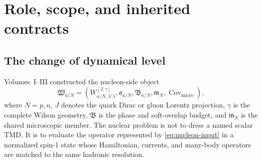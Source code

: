 \documentclass[11pt]{article}
\newcommand{\micro}{\mathrm{micro}}
\begin{document}
\begin{abstract}
Coherent small-\(x\) shadowing is formulated as a helicity-resolved
multiple-scattering amplitude using the same deuteron state and diffractive
nucleon amplitudes; polarized and tensor shadowing cannot be copied from an
unpolarized ratio.  The \(NN\pi\) sector carries a genuine spin-resolved
three-body amplitude and includes pion-active, nucleon-active, and transition
operators with a subtraction that prevents double counting the nucleon's
internal pion cloud.  \(\Delta\Delta\), six-quark, hidden-color, and
short-range sectors require explicit amplitudes and operators before they may
enter a nonzero central prediction.  Completely positive maps are derived
only after a justified partial trace; coherent sector interference remains at
amplitude level.  Partonic Wilson transport and nuclear rescattering are kept
separate and connected by an explicit overlap subtraction whenever their
soft regions coincide.

The volume concludes with formal propositions, analytic benchmarks,
machine-readable interfaces, property-based tests, a staged C4 implementation
program, and acceptance criteria for export to the common matching,
evolution, and process layer of Volume~V.
\end{abstract}

\tableofcontents

\section{Role, scope, and inherited contracts}
\label{sec:role}

\subsection{The change of dynamical level}

Volumes~I--III constructed the nucleon-side object
\begin{equation}
 \mathfrak W_{a/N}
 =\left(
 W_{a/N,\lambda'\lambda}^{[J,\gamma]},
 \mathfrak o_{a/N},
 \mathfrak B_{a/N},
 \mathfrak m_N,
 \operatorname{Cov}_{\micro}
 \right),
\label{eq:nucleon-input}
\end{equation}
where \(N=p,n\), \(J\) denotes the quark Dirac or gluon Lorentz projection,
\(\gamma\) is the complete Wilson geometry, \(\mathfrak B\) is the phase and
soft-overlap budget, and \(\mathfrak m_N\) is the shared microscopic member.
The nuclear problem is not to dress a named scalar TMD.  It is to evaluate the
operator represented by \cref{eq:nucleon-input} in a normalized spin-1 state
whose Hamiltonian, currents, and many-body operators are matched to the same
hadronic resolution.
\end{document}
